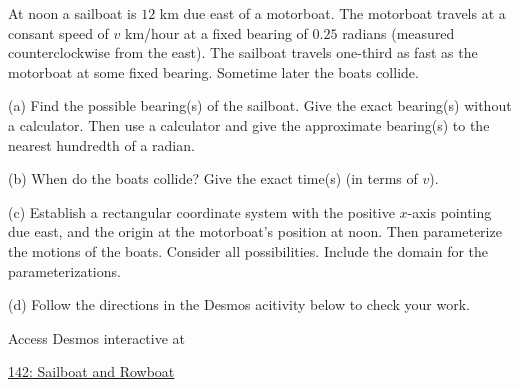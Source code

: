\documentclass{ximera}
\begin{document}
\begin{question}  \label{Qt43rderf44fd}
At noon a sailboat is $12$ km due east of a motorboat. The motorboat travels at a consant speed of $v$ km/hour at a fixed bearing of $0.25$ radians (measured counterclockwise from the east). The sailboat travels one-third as fast as the motorboat at some fixed bearing. Sometime later the boats collide.

(a) Find the possible bearing(s) of the sailboat. Give the exact bearing(s) without a calculator. Then use a calculator and give the approximate bearing(s) to the nearest hundredth of a radian.

(b) When do the boats collide? Give the exact time(s) (in terms of $v$).

(c) Establish a rectangular coordinate system with the positive $x$-axis pointing due east, and the origin at the motorboat's position at noon. Then parameterize the motions of the boats. Consider all possibilities. Include the domain for the parameterizations.

(d) Follow the directions in the Desmos acitivity below to check your work.

 
\begin{onlineOnly}
    \begin{center}
\end{center}
\end{onlineOnly}

Access Desmos interactive at

\href{https://www.desmos.com/calculator/sbl80vami2}{142: Sailboat and Rowboat}

\end{question}
\end{document}
